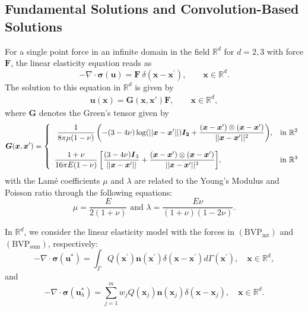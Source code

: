 \documentclass[pdflatex,sn-mathphys-num]{sn-jnl}
\newtheorem*{lemma star}{Lemma}
\begin{document}
\subsection{Fundamental Solutions and Convolution-Based Solutions}
\noindent
For a single point force in an infinite domain in the field $\mathbb{R}^d$ for $d = 2,3$ with force $\boldsymbol{F}$, the linear elasticity equation reads as
\begin{equation*}
-\nabla \cdot \boldsymbol\sigma({\boldsymbol u}) ={\boldsymbol {F}}~\delta ({\boldsymbol{x}}-{\boldsymbol{x}}%
^{\prime }), \qquad {\boldsymbol x} \in \mathbb{R}^d.   \label{8}
\end{equation*}%
The solution to this equation in $\mathbb{R}^d$ is given by
\begin{align*}
\label{Eq:fundamental_sol}
{\boldsymbol u}({\boldsymbol x}) = {\boldsymbol G}({\boldsymbol x},{\boldsymbol x'}) {\boldsymbol F}, \qquad {\boldsymbol x} \in \mathbb{R}^d,
\end{align*}
where $\boldsymbol{G}$ denotes the Green's tensor given by 
\cite{Weinberger_2005}
\begin{equation}
\boldsymbol{G}(\boldsymbol{x},\boldsymbol{x}^{\prime })=\left\{ 
\begin{array}{ll}
\displaystyle{\ \frac{1}{8\pi \mu (1-\nu )}\left( -(3-4\nu )\log (||{%
\boldsymbol{x}}-{\boldsymbol{x}}^{\prime }||){\boldsymbol{I_2}}+\frac{({%
\boldsymbol{x}}-{\boldsymbol{x}}^{\prime })\otimes ({\boldsymbol{x}}-{%
\boldsymbol{x}}^{\prime })}{||{\boldsymbol{x}}-{\boldsymbol{x}}^{\prime
}||^{2}}\right) }, & \text{in }\mathbb{R}^{2} \\ 
&  \\ 
\displaystyle{\frac{1+\nu }{16\pi E(1-\nu )}\left[ \frac{(3-4\nu )%
\boldsymbol{I}_{3}}{||\boldsymbol{x}-\boldsymbol{x}^{\prime }||}+\frac{(%
\boldsymbol{x}-\boldsymbol{x}^{\prime })\otimes (\boldsymbol{x}-\boldsymbol{x%
}^{\prime })}{||\boldsymbol{x}-\boldsymbol{x}^{\prime }||^{3}}\right] }, & 
\text{in }\mathbb{R}^{3}%
\end{array}%
\right.  \label{10}
\end{equation}%
with the Lam\'{e} coefficients $\mu $ and $\lambda $ are related to the Young's Modulus and Poisson ratio through the following equations: 
$$\mu =\frac{E}{2(1+\nu )}\text{ and }\lambda =\frac{E\nu }{(1+\nu )(1-2\nu )}.$$

In $\mathbb{R}^d$, we consider the linear elasticity model with the forces in $\mathrm{(BVP_{int})}$ and $\mathrm{(BVP_{sum})}$, respectively:
\begin{equation}
-\nabla \cdot \boldsymbol{\sigma }(\boldsymbol{u}^{\ast })=\int_{\Gamma
}Q(\boldsymbol{x}^{\prime })\boldsymbol{n}(\boldsymbol{x}^{\prime })\delta (%
\boldsymbol{x}-\boldsymbol{x}^{\prime })d\Gamma (\boldsymbol{x}^{\prime
}), \quad \boldsymbol{x}\in\mathbb{R}^d,  \label{eq:linear_elas_u_star}
\end{equation}
and 
\begin{equation}
-\nabla \cdot \boldsymbol{\sigma }(\boldsymbol{u}_{h}^{\ast
})=\sum\limits_{j=1}^{m} w_jQ(\boldsymbol{x}_{j})\boldsymbol{n}(\boldsymbol{x} _{j})\delta (\boldsymbol{x}-\boldsymbol{x}_{j}), \quad \boldsymbol{x}\in\mathbb{R}^d.  \label{eq:linear_elas_u_h_star}
\end{equation}
\end{document}
